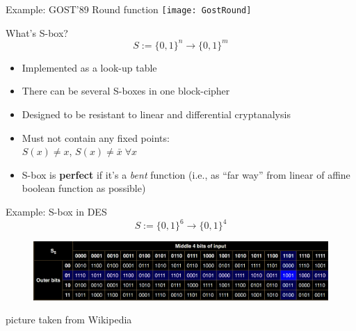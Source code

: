 \documentclass[usenames,dvipsnames, 9pt]{beamer}
\begin{document}
\begin{frame}{Example: GOST'89 Round function}
\centering
{}
\texttt{[image: GostRound]}
\end{frame}

\begin{frame}{What's S-box?}
	\LARGE
	\[
		S:= \{0,1\}^n \rightarrow \{0,1\}^m
	\]

	\begin{itemize}
		\item Implemented as a look-up table
		\item There can be several S-boxes in one block-cipher
		\item Designed to be resistant to linear and differential cryptanalysis
		\item Must not contain any fixed points: \\ $S(x) \neq x $, $S(x) \neq  \bar{x} \; \forall x$
		\item S-box is {\color{Orange}\textbf{perfect}} if it's a \emph{bent} function (i.e., as ``far way'' from linear of affine boolean function as possible) 
	\end{itemize}
\end{frame}

\begin{frame}{Example: S-box in DES}
	\Large
	\[
	S:= \{0,1\}^6 \rightarrow \{0,1\}^4
	\]
	
	\begin{figure}
		\includegraphics[width=1.1\textwidth]{DES_Sbox}
			\hspace{2em}
	\end{figure}
\vfill
\small
{\color{gray} {picture taken from Wikipedia}} 
\end{frame}
\end{document}
